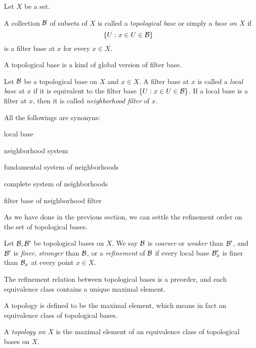 Let $X$ be a set.
\begin{defn}
A collection $\mathcal{B}$ of subsets of $X$ is called a \emph{topological base} or simply a \emph{base on $X$} if
\[\{U:x\in U\in\mathcal{B}\}\]
is a filter base at $x$ for every $x\in X$.
\end{defn}

A topological base is a kind of global version of filter base.

\begin{defn}
Let $\mathcal{B}$ be a topological base on $X$ and $x\in X$.
A filter base at $x$ is called a \emph{local base} at $x$ if it is equivalent to the filter base $\{U:x\in U\in\mathcal{B}\}$.
If a local base is a filter at $x$, then it is called \emph{neighborhood filter} of $x$.
\end{defn}
All the followings are synonyns:
\begin{cond}
\item local base
\item neighborhood system
\item fundamental system of neighborhoods
\item complete system of neighborhoods
\item filter base of neighborhood filter
\end{cond}

As we have done in the previous section, we can settle the refinement order on the set of topological bases.

\begin{defn}
Let $\mathcal{B},\mathcal{B}'$ be topological bases on $X$.
We say $\mathcal{B}$ is \emph{coarser} or \emph{weaker} than $\mathcal{B}'$, and $\mathcal{B}'$ is \emph{finer}, \emph{stronger} than $\mathcal{B}$, or a \emph{refinement} of $\mathcal{B}$ if every local base $\mathcal{B}'_x$ is finer than $\mathcal{B}_x$ at every point $x\in X$.
\end{defn}
\begin{prop}
The refinement relation between topological bases is a preorder, and each equivalence class contains a unique maximal element.
\end{prop}
\begin{pf}
\end{pf}

A topology is defined to be the maximal element, which means in fact an equivalence class of topological bases.

\begin{defn}
A \emph{topology on $X$} is the maximal element of an equivalence class of topological bases on $X$.
\end{defn}


